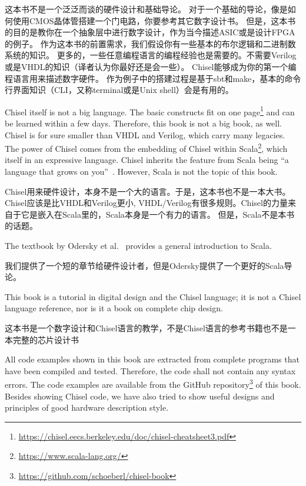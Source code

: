 \documentclass[%
    10pt,
    headinclude, footexclude,
    openright, %
    notitlepage,
    cleardoubleempty,
    headsepline,
    pointlessnumbers,
    bibtotoc, idxtotoc,
    ]{scrbook}
\newcommand{\myref}[2]{\href{#1}{#2}}
\renewcommand{\myref}[2]{{#2}{\footnote{\url{#1}}}}
\begin{document}
这本书不是一个泛泛而谈的硬件设计和基础导论。
对于一个基础的导论，像是如何使用CMOS晶体管搭建一个门电路，你要参考其它数字设计书。
但是，这本书的目的是教你在一个抽象层中进行数字设计，作为当今描述ASIC或是设计FPGA的例子。
作为这本书的前置需求，我们假设你有一些基本的布尔逻辑和二进制数系统的知识。
更多的，一些任意编程语言的编程经验也是需要的。不需要Verilog或是VHDL的知识（译者认为你最好还是会一些）。
Chisel能够成为你的第一个编程语言用来描述数字硬件。
作为例子中的搭建过程是基于sbt和make，基本的命令行界面知识（CLI，又称terminal或是Unix shell）会是有用的。

Chisel itself is not a big language. The basic constructs fit on
\myref{https://chisel.eecs.berkeley.edu/doc/chisel-cheatsheet3.pdf}{one page}
and can be learned within a few days.
Therefore, this book is not a big book, as well.
Chisel is for sure smaller than VHDL and Verilog, which carry many legacies.
The power of Chisel comes from the embedding of Chisel within
\myref{https://www.scala-lang.org/}{Scala}, which itself in an expressive language.
Chisel inherits the feature from Scala being ``a language that grows on you''~\cite{Scala}.
However, Scala is not the topic of this book.

Chisel用来硬件设计，本身不是一个大的语言。于是，这本书也不是一本大书。Chisel应该是比VHDL和Verilog更小, 
VHDL/Verilog有很多规则。Chisel的力量来自于它是嵌入在Scala里的，Scala本身是一个有力的语言。
但是，Scala不是本书的话题。

The textbook by Odersky et al.~\cite{Scala} provides a general introduction
to Scala.

我们提供了一个短的章节给硬件设计者，但是Odersky提供了一个更好的Scala导论。

This book is a tutorial in digital design and the Chisel language; it is not
a Chisel language reference, nor is it a book on complete chip design.

这本书是一个数字设计和Chisel语言的教学，不是Chisel语言的参考书籍也不是一本完整的芯片设计书

All code examples shown in this book are extracted from complete programs
that have been compiled and tested. Therefore, the code shall not contain
any syntax errors. The code examples are available from the
\myref{https://github.com/schoeberl/chisel-book}{GitHub repository}
of this book.
Besides showing Chisel code, we have also tried to show useful designs and
principles of good hardware description style.
\end{document}
